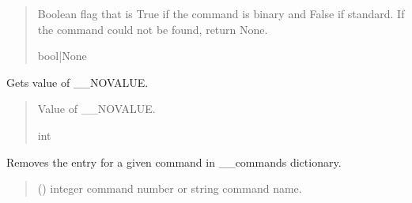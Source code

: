 \documentclass[letterpaper,10pt,english]{sphinxmanual}
\begin{document}
\begin{fulllineitems}
\begin{fulllineitems}
\begin{quote}
\begin{description}
\sphinxAtStartPar
Boolean flag that is True if the command is binary and False if standard. If the                 command could not be found, return None.

\sphinxAtStartPar
bool|None

\end{description}\end{quote}

\end{fulllineitems}


\begin{fulllineitems}
\label{\detokenize{PodCommands:PodCommands.POD_Commands.NoValue}}
\pysigstartsignatures
{}
\pysigstopsignatures
\sphinxAtStartPar
Gets value of \_\_NOVALUE.
\begin{quote}\begin{description}
\sphinxAtStartPar
Value of \_\_NOVALUE.

\sphinxAtStartPar
int

\end{description}\end{quote}

\end{fulllineitems}


\begin{fulllineitems}
\label{\detokenize{PodCommands:PodCommands.POD_Commands.RemoveCommand}}
\pysigstartsignatures
{}
\pysigstopsignatures
\sphinxAtStartPar
Removes the entry for a given command in \_\_commands dictionary.
\begin{quote}\begin{description}
\sphinxAtStartPar
{} (\sphinxstyleliteralemphasis{\sphinxupquote{ | }}) \textendash{} integer command number or string command name.


\end{description}
\end{quote}
\end{fulllineitems}
\end{fulllineitems}
\end{document}
